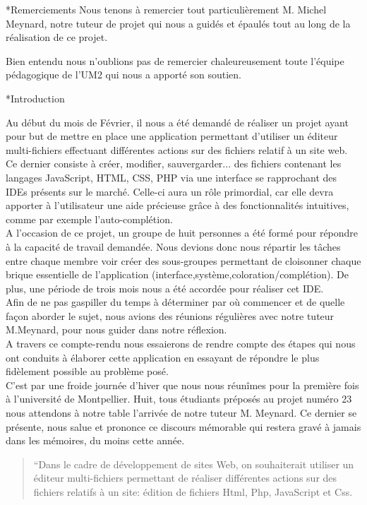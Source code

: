 \documentclass[a4paper, 12pt]{report}
\begin{document}
	\begin{chapter}*{Remerciements}
	Nous tenons à remercier tout particulièrement M. Michel Meynard, notre tuteur de projet qui nous a guidés et épaulés tout au long de la réalisation de ce projet. 

	Bien entendu nous n'oublions pas de remercier chaleureusement toute l'équipe pédagogique de l'UM2 qui nous a apporté son soutien.
	\end{chapter} 
	\tableofcontents
	\begin{chapter}*{Introduction}

		Au début du mois de Février, il nous a été demandé de réaliser un projet ayant pour but de mettre en place une application permettant
	d'utiliser un éditeur multi-fichiers effectuant différentes actions sur des fichiers relatif à un site web.\\
	Ce dernier consiste à créer, modifier, sauvergarder... des fichiers contenant les langages JavaScript, HTML, CSS, PHP via une interface se
	rapprochant des IDEs présents sur le marché. Celle-ci aura un rôle primordial, car elle devra apporter à l'utilisateur une aide précieuse grâce
	à des fonctionnalités intuitives, comme par exemple l'auto-complétion.\\
	A l'occasion de ce projet, un groupe de huit personnes a été formé pour répondre à la capacité de travail demandée. Nous devions donc nous 
	répartir les tâches entre chaque membre voir créer des sous-groupes permettant de cloisonner chaque brique essentielle de l'application 
	(interface,système,coloration/complétion). De plus, une période de trois mois nous a été accordée pour réaliser cet IDE.\\
	Afin de ne pas gaspiller du temps à déterminer par où commencer et de quelle façon aborder le sujet, nous avions des réunions régulières avec 
	notre tuteur M.Meynard, pour nous guider dans notre réflexion.\\
	A travers ce compte-rendu nous essaierons de rendre compte des étapes qui nous ont conduits à élaborer cette application en essayant de répondre 
	le plus fidèlement possible au problème posé.\\ 

	\newpage
	C'est par une froide journée d'hiver que nous nous réunîmes pour la première fois à l'université de Montpellier. 
	Huit, tous étudiants préposés au projet numéro 23 nous attendons à notre table l'arrivée de notre tuteur M. Meynard. 
	Ce dernier se présente, nous salue et prononce ce discours mémorable qui restera gravé à jamais dans les mémoires, du moins cette année.\\
	\begin{quotation}
		``Dans le cadre de développement de sites Web, on souhaiterait utiliser un éditeur multi-fichiers permettant de réaliser différentes actions sur
		des fichiers relatifs à un site: édition de fichiers Html, Php, JavaScript et Css.


\end{quotation}
\end{chapter}
\end{document}
